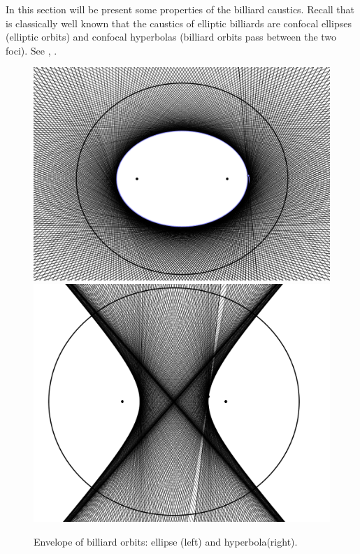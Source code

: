 
 
  In this section will be present some properties of the billiard caustics.  Recall that is classically well known that the caustics of elliptic billiards are confocal ellipses (elliptic orbits) and confocal hyperbolas (billiard orbits pass between the two foci). See \cite[Chapter XI]{berger-2005}, \cite[Chapter 6]{hassel-2003}. 
  \begin{figure} 
	\begin{center}
	 \includegraphics[scale=0.3]{zappC/pics/pics_appC_120_caustica_EH.png}
	 	 \includegraphics[scale=0.3]{zappC/pics/pics_appC_130_caustica_HE.png}
		\caption {Envelope of billiard orbits: ellipse (left) and hyperbola(right). \label{fig:envelope}}
	\end{center}
\end{figure}
  
